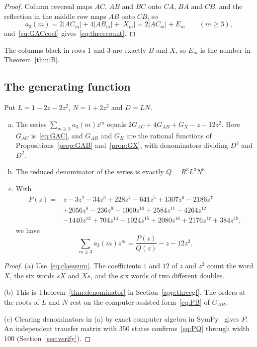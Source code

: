 \begin{proof}
Column reversal maps $AC$, $AB$ and $BC$ onto $CA$, $BA$ and $CB$, and the reflection in the
middle row maps $AB$ onto $CB$, so
\begin{equation}\label{eq:classsum}
a_3(m)=2|AC_m|+4|AB_m|+|X_m|=2|AC_m|+E_m\qquad(m\ge3),
\end{equation}
and~\eqref{eq:GACcoef} gives~\eqref{eq:threecount}.
\end{proof}

The columns black in rows $1$ and $3$ are exactly $B$ and $X$, so $E_m$ is the
number in Theorem~\ref{thm:B}.

\subsection{The generating function}

Put $L=1-2z-2z^2$, $N=1+2z^2$ and $D=LN$.

\begin{theorem}\label{thm:threegf}
\leavevmode
\begin{enumerate}[(a)]
\item The series $\sum_{m\ge3}a_3(m)z^m$ equals $2G_{AC}+4G_{AB}+G_X-z-12z^2$. Here $G_{AC}$
is~\eqref{eq:GAC}, and $G_{AB}$ and $G_X$ are the rational functions of
Propositions~\ref{prop:GAB} and~\ref{prop:GX}, with denominators dividing $D^3$ and $D^2$.
\item The reduced denominator of the series is exactly $Q=R^3L^3N^3$.
\item With
\begin{align*}
P(z)={}&z-3z^2-34z^3+228z^4-641z^5+1307z^6-2186z^7\\
&+2056z^8-236z^9-1060z^{10}+2584z^{11}-4264z^{12}\\
&-1440z^{13}+704z^{14}-1024z^{15}+2080z^{16}+2176z^{17}+384z^{18},
\end{align*}
we have
\begin{equation}\label{eq:PQ}
\sum_{m\ge3}a_3(m)z^m=\frac{P(z)}{Q(z)}-z-12z^2.
\end{equation}
\end{enumerate}
\end{theorem}

\begin{proof}
(a) Use~\eqref{eq:classsum}. The coefficients $1$ and $12$ of $z$ and $z^2$ count the word $X$,
the six words $sX$ and $Xs$, and the six words of two different doubles.

(b) This is Theorem~\ref{thm:denominator} in Section~\ref{app:threegf}. The orders at the
roots of $L$ and $N$ rest on the computer-assisted form~\eqref{eq:PB} of $G_{AB}$.

(c) Clearing denominators in (a) by exact computer algebra in SymPy~\cite{sympy2017} gives $P$. An independent transfer
matrix with $350$ states confirms~\eqref{eq:PQ} through width $100$ (Section~\ref{sec:verify}).
\end{proof}

